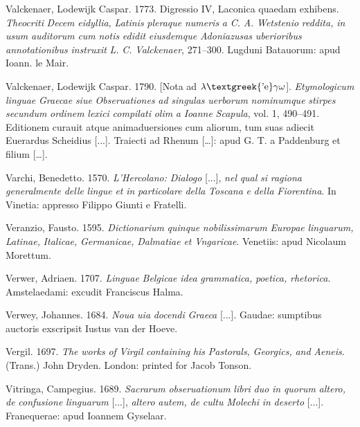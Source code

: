 \documentclass[output=paper]{langsci/langscibook}
\begin{document}
Valckenaer, Lodewijk Caspar. 1773. Digressio IV, Laconica quaedam exhibens. \textit{Theocriti} \textit{Decem} \textit{eidyllia,} \textit{Latinis} \textit{pleraque} \textit{numeris} \textit{a} \textit{C.} \textit{A.} \textit{Wetstenio} \textit{reddita,} \textit{in} \textit{usum} \textit{auditorum} \textit{cum} \textit{notis} \textit{edidit} \textit{eiusdemque} \textit{Adoniazusas} \textit{uberioribus} \textit{annotationibus} \textit{instruxit} \textit{L.} \textit{C.} \textit{Valckenaer}, 271–300. Lugduni Batauorum: apud Ioann. le Mair.

Valckenaer, Lodewijk Caspar. 1790. [Nota ad $\lambda \text{\textgreek{'e}}\gamma \omega $]. \textit{Etymologicum} \textit{linguae} \textit{Graecae} \textit{siue} \textit{Obseruationes} \textit{ad} \textit{singulas} \textit{uerborum} \textit{nominumque} \textit{stirpes} \textit{secundum} \textit{ordinem} \textit{lexici} \textit{compilati} \textit{olim} \textit{a} \textit{Ioanne} \textit{Scapula}, vol. 1, 490–491. Editionem curauit atque animaduersiones cum aliorum, tum suas adiecit Euerardus Scheidius [...]. Traiecti ad Rhenum […]: apud G. T. a Paddenburg et filium […].

Varchi, Benedetto. 1570. \textit{L’Hercolano:} \textit{Dialogo} [...], \textit{nel} \textit{qual} \textit{si} \textit{ragiona} \textit{generalmente} \textit{delle} \textit{lingue} \textit{et} \textit{in} \textit{particolare} \textit{della} \textit{Toscana} \textit{e} \textit{della} \textit{Fiorentina}. In Vinetia: appresso Filippo Giunti e Fratelli.

Veranzio, Fausto. 1595. \textit{Dictionarium} \textit{quinque} \textit{nobilissimarum} \textit{Europae} \textit{linguarum,} \textit{Latinae,} \textit{Italicae,} \textit{Germanicae,} \textit{Dalmatiae} \textit{et} \textit{Vngaricae}. Venetiis: apud Nicolaum Morettum.

Verwer, Adriaen. 1707. \textit{Linguae} \textit{Belgicae} \textit{idea} \textit{grammatica,} \textit{poetica,} \textit{rhetorica}. Amstelaedami: excudit Franciscus Halma.

Verwey, Johannes. 1684. \textit{Noua} \textit{uia} \textit{docendi} \textit{Graeca} [...]. Gaudae: sumptibus auctoris exscripsit Iustus van der Hoeve.

Vergil. 1697. \textit{The} \textit{works} \textit{of} \textit{Virgil} \textit{containing} \textit{his} \textit{Pastorals,} \textit{Georgics,} \textit{and} \textit{Aeneis}. (Trans.) John Dryden. London: printed for Jacob Tonson.

Vitringa, Campegius. 1689. \textit{Sacrarum} \textit{obseruationum} \textit{libri} \textit{duo} \textit{in} \textit{quorum} \textit{altero,} \textit{de} \textit{confusione} \textit{linguarum} [...], \textit{altero} \textit{autem,} \textit{de} \textit{cultu} \textit{Molechi} \textit{in} \textit{deserto} [...]. Franequerae: apud Ioannem Gyselaar.
\end{document}
